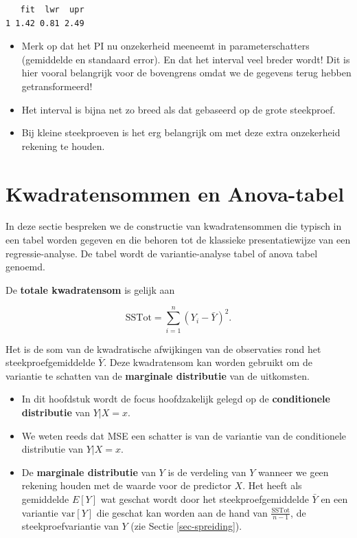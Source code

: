 \documentclass[
  dutch,
  letterpaper,
  12pt]{book}
\providecommand{\tightlist}{%
  \setlength{\itemsep}{0pt}\setlength{\parskip}{0pt}}
\theoremstyle{definition}
\theoremstyle{definition}
\theoremstyle{definition}
\theoremstyle{remark}
\begin{document}
\begin{verbatim}
   fit  lwr  upr
1 1.42 0.81 2.49
\end{verbatim}

\begin{itemize}
\item
  Merk op dat het PI nu onzekerheid meeneemt in parameterschatters
  (gemiddelde en standaard error). En dat het interval veel breder
  wordt! Dit is hier vooral belangrijk voor de bovengrens omdat we de
  gegevens terug hebben getransformeerd!
\item
  Het interval is bijna net zo breed als dat gebaseerd op de grote
  steekproef.
\item
  Bij kleine steekproeven is het erg belangrijk om met deze extra
  onzekerheid rekening te houden.
\end{itemize}

\section{Kwadratensommen en Anova-tabel}\label{sec-linAnova}

In deze sectie bespreken we de constructie van kwadratensommen die
typisch in een tabel worden gegeven en die behoren tot de klassieke
presentatiewijze van een regressie-analyse. De tabel wordt de
variantie-analyse tabel of anova tabel genoemd.

De \textbf{totale kwadratensom} is gelijk aan

\[\text{SSTot} = \sum_{i=1}^n (Y_i-\bar{Y})^2.\]

Het is de som van de kwadratische afwijkingen van de observaties rond
het steekproefgemiddelde \(\bar Y\). Deze kwadratensom kan worden
gebruikt om de variantie te schatten van de \textbf{marginale
distributie} van de uitkomsten.

\begin{itemize}
\tightlist
\item
  In dit hoofdstuk wordt de focus hoofdzakelijk gelegd op de
  \textbf{conditionele distributie} van \(Y\vert X=x\).
\item
  We weten reeds dat MSE een schatter is van de variantie van de
  conditionele distributie van \(Y\vert X=x\).
\item
  De \textbf{marginale distributie} van \(Y\) is de verdeling van \(Y\)
  wanneer we geen rekening houden met de waarde voor de predictor \(X\).
  Het heeft als gemiddelde \(E[Y]\) wat geschat wordt door het
  steekproefgemiddelde \(\bar{Y}\) en een variantie \(\text{var}[Y]\)
  die geschat kan worden aan de hand van \(\frac{\text{SSTot}}{n-1}\),
  de steekproefvariantie van \(Y\) (zie Sectie \ref{sec-spreiding}).
\end{itemize}
\end{document}
